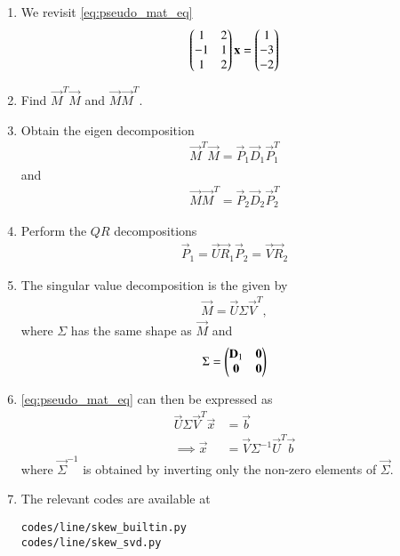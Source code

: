 \renewcommand{\theequation}{\theenumi}
\begin{enumerate}[label=\thesubsection.\arabic*.,ref=\thesubsection.\theenumi]

\item We revisit \eqref{eq:pseudo_mat_eq}
%
\begin{align}
\begin{pmatrix}
1 & 2
\\
-1 & 1
\\
1 & 2
\end{pmatrix}
\mathbf{x} =
\begin{pmatrix}1 \\ -3 \\ -2\end{pmatrix}
\end{align}

\item Find $\vec{M}^T\vec{M}$ and $\vec{M}\vec{M}^T$.
\item Obtain the eigen decomposition 
\begin{align}
\vec{M}^T\vec{M} = \vec{P}_1\vec{D}_1\vec{P}_1^T
\end{align}
and 
\begin{align}
\vec{M}\vec{M}^T = \vec{P}_2\vec{D}_2\vec{P}_2^T
\end{align}
\item Perform the $QR$ decompositions
\begin{align}
\vec{P}_1 = \vec{U}\vec{R}_1
\vec{P}_2 = \vec{V}\vec{R}_2
\end{align}
\item The singular value decomposition is the given by
\begin{align}
\vec{M} = \vec{U} \Sigma \vec{V}^T,
\end{align}
where $\Sigma$ has the same shape as $\vec{M}$ and
\begin{align}
\Sigma = \begin{pmatrix}\mathbf{D}_1 & \mathbf{0} \\ \mathbf{0} & \mathbf{0}\end{pmatrix}
\end{align}
\item \eqref{eq:pseudo_mat_eq} can then be expressed as
\begin{align}
\vec{U} \Sigma \vec{V}^T \vec{x} &= \vec{b}
\\
\implies \vec{x} & = \vec{V}\Sigma^{-1} \vec{U}^T \vec{b}
\end{align}
%
where $\vec{\Sigma}^{-1}$ is obtained by inverting  only the non-zero elements of $\vec{\Sigma}$.
\item The relevant codes are available at
\begin{lstlisting}
codes/line/skew_builtin.py
codes/line/skew_svd.py
\end{lstlisting}
\end{enumerate}
